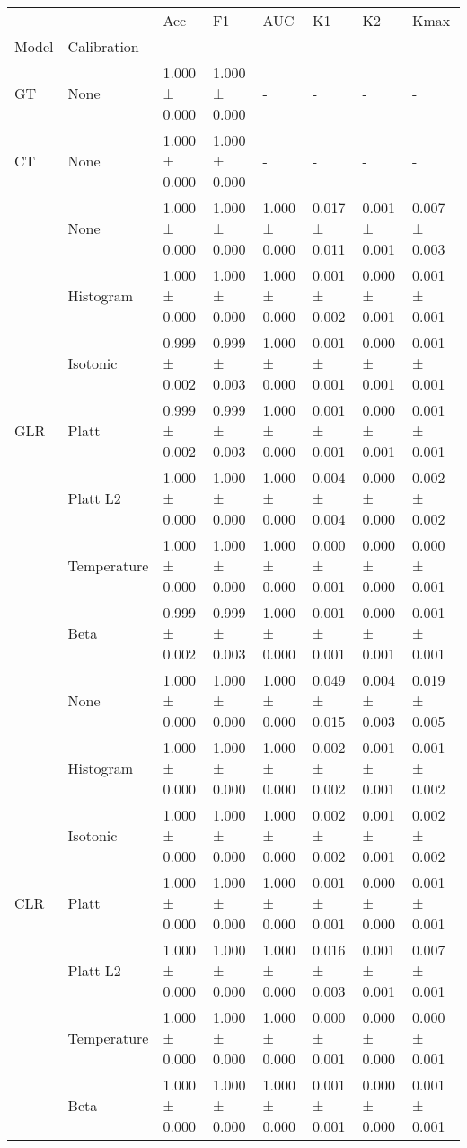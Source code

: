 \begin{tabular}{llllllll}
\toprule
 &  & Acc & F1 & AUC & K1 & K2 & Kmax \\
Model & Calibration &  &  &  &  &  &  \\
\midrule
GT & None & 1.000 ± 0.000 & 1.000 ± 0.000 & - & - & - & - \\
\cline{1-8}
CT & None & 1.000 ± 0.000 & 1.000 ± 0.000 & - & - & - & - \\
\cline{1-8}
\multirow[t]{7}{*}{GLR} & None & 1.000 ± 0.000 & 1.000 ± 0.000 & 1.000 ± 0.000 & 0.017 ± 0.011 & 0.001 ± 0.001 & 0.007 ± 0.003 \\
 & Histogram & 1.000 ± 0.000 & 1.000 ± 0.000 & 1.000 ± 0.000 & 0.001 ± 0.002 & 0.000 ± 0.001 & 0.001 ± 0.001 \\
 & Isotonic & 0.999 ± 0.002 & 0.999 ± 0.003 & 1.000 ± 0.000 & 0.001 ± 0.001 & 0.000 ± 0.001 & 0.001 ± 0.001 \\
 & Platt & 0.999 ± 0.002 & 0.999 ± 0.003 & 1.000 ± 0.000 & 0.001 ± 0.001 & 0.000 ± 0.001 & 0.001 ± 0.001 \\
 & Platt L2 & 1.000 ± 0.000 & 1.000 ± 0.000 & 1.000 ± 0.000 & 0.004 ± 0.004 & 0.000 ± 0.000 & 0.002 ± 0.002 \\
 & Temperature & 1.000 ± 0.000 & 1.000 ± 0.000 & 1.000 ± 0.000 & 0.000 ± 0.001 & 0.000 ± 0.000 & 0.000 ± 0.001 \\
 & Beta & 0.999 ± 0.002 & 0.999 ± 0.003 & 1.000 ± 0.000 & 0.001 ± 0.001 & 0.000 ± 0.001 & 0.001 ± 0.001 \\
\cline{1-8}
\multirow[t]{7}{*}{CLR} & None & 1.000 ± 0.000 & 1.000 ± 0.000 & 1.000 ± 0.000 & 0.049 ± 0.015 & 0.004 ± 0.003 & 0.019 ± 0.005 \\
 & Histogram & 1.000 ± 0.000 & 1.000 ± 0.000 & 1.000 ± 0.000 & 0.002 ± 0.002 & 0.001 ± 0.001 & 0.001 ± 0.002 \\
 & Isotonic & 1.000 ± 0.000 & 1.000 ± 0.000 & 1.000 ± 0.000 & 0.002 ± 0.002 & 0.001 ± 0.001 & 0.002 ± 0.002 \\
 & Platt & 1.000 ± 0.000 & 1.000 ± 0.000 & 1.000 ± 0.000 & 0.001 ± 0.001 & 0.000 ± 0.000 & 0.001 ± 0.001 \\
 & Platt L2 & 1.000 ± 0.000 & 1.000 ± 0.000 & 1.000 ± 0.000 & 0.016 ± 0.003 & 0.001 ± 0.001 & 0.007 ± 0.001 \\
 & Temperature & 1.000 ± 0.000 & 1.000 ± 0.000 & 1.000 ± 0.000 & 0.000 ± 0.001 & 0.000 ± 0.000 & 0.000 ± 0.001 \\
 & Beta & 1.000 ± 0.000 & 1.000 ± 0.000 & 1.000 ± 0.000 & 0.001 ± 0.001 & 0.000 ± 0.000 & 0.001 ± 0.001 \\

\end{tabular}

